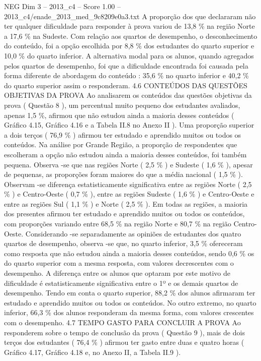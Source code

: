 \begin{textsample}{NEG Dim 3 – 2013\_c4 – Score 1.00 – 2013\_c4/enade\_2013\_med\_9c8209e0a3.txt}
A proporção dos que declararam não ter qualquer dificuldade para responder à prova variou de 13,8 \% na região Norte a 17,6 \% na Sudeste.
Com relação aos quartos de desempenho, o desconhecimento do conteúdo, foi a opção escolhida por 8,8 \% dos estudantes do quarto superior e 10,0 \% do quarto inferior.
A alternativa modal para os alunos, quando agregados pelos quartos de desempenho, foi que a dificuldade encontrada foi causada pela forma diferente de abordagem do conteúdo : 35,6 \% no quarto inferior e 40,2 \% do quarto superior assim o responderam. 4.6 CONTEÚDOS DAS QUESTÕES OBJETIVAS DA PROVA Ao analisarem os conteúdos das questões objetivas da prova ( Questão 8 ), um percentual muito pequeno dos estudantes avaliados, apenas 1,5 \%, afirmou que não estudou ainda a maioria desses conteúdos ( Gráfico 4.15, Gráfico 4.16 e a Tabela II.8 no Anexo II ).
Uma proporção superior a dois terços ( 76,9 \% ) afirmou ter estudado e aprendido muitos ou todos os conteúdos.
Na análise por Grande Região, a proporção de respondentes que escolheram a opção não estudou ainda a maioria desses conteúdos, foi também pequena.
Observa -se que nas regiões Norte ( 2,5 \% ) e Sudeste ( 1,6 \% ), apesar de pequenas, as proporções foram maiores do que a média nacional ( 1,5 \% ).
Observam -se diferença estatisticamente significativa entre as regiões Norte ( 2,5 \% ) e Centro-Oeste ( 0,7 \% ), entre as regiões Sudeste ( 1,6 \% ) e Centro-Oeste e entre as regiões Sul ( 1,1 \% ) e Norte ( 2,5 \% ).
Em todas as regiões, a maioria dos presentes afirmou ter estudado e aprendido muitos ou todos os conteúdos, com proporções variando entre 68,5 \% na região Norte e 80,7 \% na região Centro-Oeste.
Considerando -se separadamente as opiniões de estudantes dos quatro quartos de desempenho, observa -se que, no quarto inferior, 3,5 \% ofereceram como resposta que não estudou ainda a maioria desses conteúdos, sendo 0,6 \% os do quarto superior com a mesma resposta, com valores decrescentes com o desempenho.
A diferença entre os alunos que optaram por este motivo de dificuldade é estatisticamente significativa entre o 1º e os demais quartos de desempenho.
Tendo em conta o quarto superior, 88,2 \% dos alunos afirmaram ter estudado e aprendido muitos ou todos os conteúdos.
No outro extremo, no quarto inferior, 66,3 \% dos alunos responderam da mesma forma, com valores crescentes com o desempenho. 4.7 TEMPO GASTO PARA CONCLUIR A PROVA Ao responderem sobre o tempo de conclusão da prova ( Questão 9 ), mais de dois terços dos estudantes ( 76,4 \% ) afirmou ter gasto entre duas e quatro horas ( Gráfico 4.17, Gráfico 4.18 e, no Anexo II, a Tabela II.9 ).

\end{textsample}
